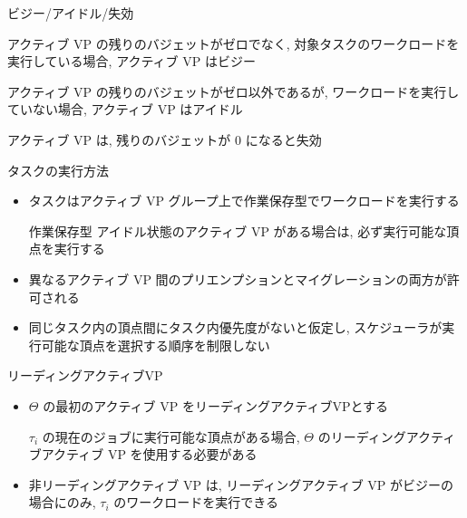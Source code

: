 \begin{frame}{ビジー/アイドル/失効}
    \begin{definition}[ビジー]
        アクティブ VP の残りのバジェットがゼロでなく, 対象タスクのワークロードを実行している場合, アクティブ VP はビジー
    \end{definition}
    \begin{definition}[アイドル]
        アクティブ VP の残りのバジェットがゼロ以外であるが, ワークロードを実行していない場合, アクティブ VP はアイドル
    \end{definition}
    \begin{definition}[失効]
        アクティブ VP は, 残りのバジェットが 0 になると失効
    \end{definition}
\end{frame}

\begin{frame}{タスクの実行方法}
    \begin{itemize}
        \item タスクはアクティブ VP グループ上で作業保存型でワークロードを実行する
              \begin{block}{作業保存型}
                  アイドル状態のアクティブ VP がある場合は, 必ず実行可能な頂点を実行する
              \end{block}
              \vspace{5mm}
        \item 異なるアクティブ VP 間のプリエンプションとマイグレーションの両方が許可される
        \item 同じタスク内の頂点間にタスク内優先度がないと仮定し, スケジューラが実行可能な頂点を選択する順序を制限しない
    \end{itemize}
\end{frame}

\begin{frame}{リーディングアクティブVP}
    \begin{itemize}
        \item $\Theta$ の最初のアクティブ VP をリーディングアクティブVPとする
              \begin{definition}[リーディングアクティブ VP]
                $\tau_{i}$ の現在のジョブに実行可能な頂点がある場合, $\Theta$ のリーディングアクティブアクティブ VP を使用する必要がある
              \end{definition}
              \vspace{5mm}
        \item 非リーディングアクティブ VP は, リーディングアクティブ VP がビジーの場合にのみ, $\tau_{i}$ のワークロードを実行できる
    \end{itemize}
\end{frame}

